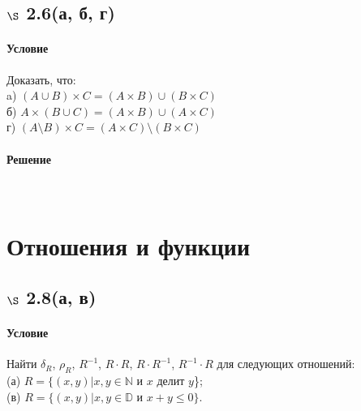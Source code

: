 \documentclass[a4paper,12pt]{article}
\begin{document}
\subsection*{$\S$ 2.6(а, б, г)}
\paragraph*{Условие}
Доказать, что:\\
a) $ ( A \cup B ) \times C = ( A \times B ) \cup ( B \times C ) $\\
б) $ A \times ( B \cup C ) = ( A \times B ) \cup ( A \times C ) $\\
г) $ ( A \setminus B ) \times C = ( A \times C ) \setminus ( B \times C ) $
\paragraph*{Решение} \mbox{}\\

\section{Отношения и функции}
\subsection*{$\S$ 2.8(а, в)}
\paragraph*{Условие}
Найти $\delta_R$, $\rho_R$, $R^{-1}$, $R\cdot R$, $R\cdot R^{-1}$, $R^{-1}\cdot R$ для следующих отношений:\\
(а) $R=\{(x,y)|x,y\in \mathbb{N}$ и $x$ делит $y$\}; \\
(в) $R=\{(x,y)|x,y\in \mathbb{D}$ и $x+y\leqslant 0\}$. 
\end{document}
